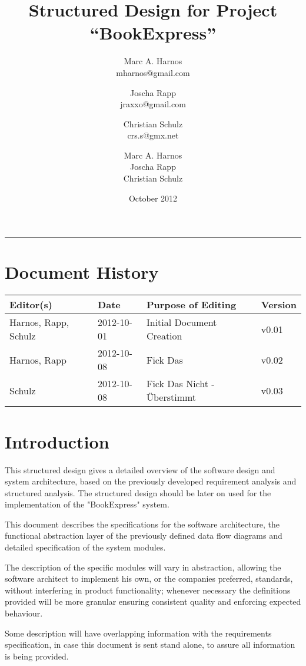 \documentclass[11pt,a4paper,oneside,svgnames]{report}
\title{Structured Design for Project ``BookExpress''}
\author{Marc A. Harnos\\ {mharnos@gmail.com} \and Joscha Rapp\\ {jraxxo@gmail.com} \and Christian Schulz\\ {crs.s@gmx.net}}
\author{Marc A. Harnos\\ Joscha Rapp\\ Christian Schulz}
\date{October 2012}
\makeatletter
\renewcommand{\maketitle}{\begin{titlepage}%
    \let\footnotesize\small
    \let\footnoterule\relax
    \parindent \z@
    \reset@font
    \null\vfil
    \begin{flushleft}
      \huge \@title
    \end{flushleft}
    \par
    \hrule height 4pt
    \par
    \begin{flushright}
      \LARGE \@author \par
    \end{flushright}
    \vskip 60\p@
    \vfil\null
  \end{titlepage}%
  \setcounter{footnote}{0}%
}
\makeatother
\begin{document}
\maketitle
\tableofcontents

\chapter*{Document History}

\begin{center}

\begin{tabular}{|l|l|l|l|}
\hline 
Editor(s) & Date & Purpose of Editing & Version \\ 
\hline 
Harnos, Rapp, Schulz & 2012-10-01 & Initial Document Creation & v0.01 \\ 
\hline
Harnos, Rapp & 2012-10-08 & Fick Das & v0.02 \\ 
\hline
Schulz & 2012-10-08 & Fick Das Nicht - Überstimmt & v0.03 \\ 
\hline 
\end{tabular} 

\end{center}


\chapter{Introduction}
This structured design gives a detailed overview of the software design and system architecture, based on the previously developed requirement analysis and structured analysis. The structured design should be later on used for the implementation of the "BookExpress" system.

This document describes the specifications for the software architecture, the functional abstraction layer of the previously defined data flow diagrams and detailed specification of the system modules.

The description of the specific modules will vary in abstraction, allowing the software architect to implement his own, or the companies preferred, standards, without interfering in product functionality; whenever necessary the definitions provided will be more granular ensuring consistent quality and enforcing expected behaviour.

Some description will have overlapping information with the requirements specification, in case this document is sent stand alone, to assure all information is being provided.
\end{document}
